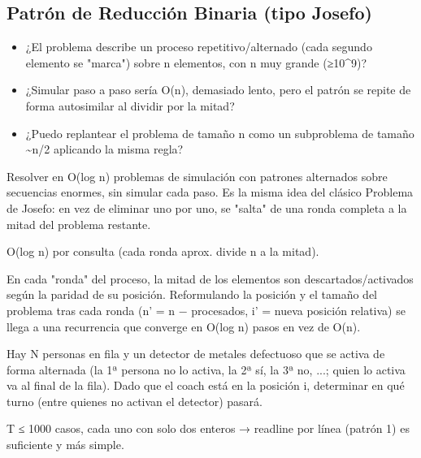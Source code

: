\subsection{Patrón de Reducción Binaria (tipo Josefo)}


\begin{itemize}
\item ¿El problema describe un proceso repetitivo/alternado (cada segundo elemento se "marca") sobre n elementos, con n muy grande (≥10\textasciicircum{}9)?
\item ¿Simular paso a paso sería O(n), demasiado lento, pero el patrón se repite de forma autosimilar al dividir por la mitad?
\item ¿Puedo replantear el problema de tamaño n como un subproblema de tamaño \textasciitilde{}n/2 aplicando la misma regla?
\end{itemize}

 Resolver en O(log n) problemas de simulación con patrones alternados sobre secuencias enormes, sin simular cada paso. Es la misma idea del clásico Problema de Josefo: en vez de eliminar uno por uno, se "salta" de una ronda completa a la mitad del problema restante.

 O(log n) por consulta (cada ronda aprox. divide n a la mitad).

 En cada "ronda" del proceso, la mitad de los elementos son descartados/activados según la paridad de su posición. Reformulando la posición y el tamaño del problema tras cada ronda (n' = n − procesados, i' = nueva posición relativa) se llega a una recurrencia que converge en O(log n) pasos en vez de O(n).


Hay N personas en fila y un detector de metales defectuoso que se activa de forma alternada (la 1ª persona no lo activa, la 2ª sí, la 3ª no, ...; quien lo activa va al final de la fila). Dado que el coach está en la posición i, determinar en qué turno (entre quienes no activan el detector) pasará.

 T ≤ 1000 casos, cada uno con solo dos enteros → readline por línea (patrón 1) es suficiente y más simple.


